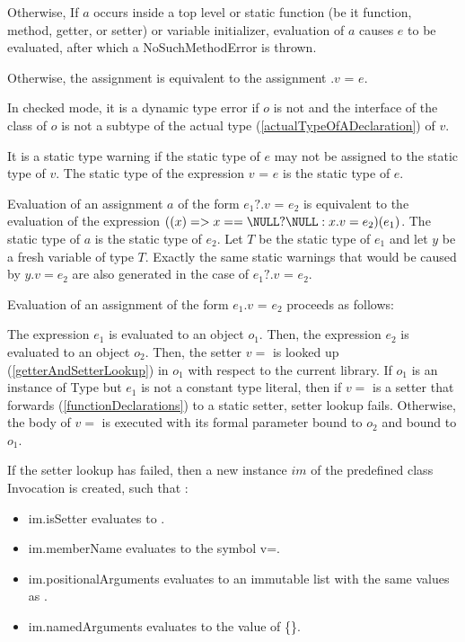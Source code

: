\documentclass{article}
\newcommand{\code}[1]{{\sf #1}}
\begin{document}
\LMHash{}
Otherwise, If  $a$ occurs inside a top level or static function (be it function, method, getter,  or setter) or variable initializer, evaluation of $a$ causes $e$ to be evaluated, after which a \code{NoSuchMethodError} is thrown. 

\LMHash{}
Otherwise, the assignment is equivalent to the assignment \code{ \THIS{}.$v$ = $e$}. 

\LMHash{}
In checked mode, it is a dynamic type error if $o$ is not \NULL{} and the interface of the class of $o$ is not a subtype of the actual type (\ref{actualTypeOfADeclaration}) of $v$.

\LMHash{}
It is a static type warning if the static type of $e$ may not be assigned to the static type of $v$. The static type of the expression $v$ \code{=} $e$ is the static type of $e$.

\LMHash{}
Evaluation of an assignment $a$ of the form $e_1?.v$ \code{=} $e_2$ is equivalent to the evaluation of the expression $((x) => x == \NULL? \NULL: x.v = e_2)(e_1)$. The static type of $a$ is the static type of $e_2$. Let $T$ be the static type of $e_1$ and let $y$ be a fresh variable of type $T$. Exactly the same static warnings that would be caused by $y.v = e_2$ are also generated in the case of $e_1?.v$ \code{=} $e_2$.

\LMHash{}
Evaluation of an assignment of the form $e_1.v$ \code{=} $e_2$ proceeds as follows:

\LMHash{}
The expression $e_1$ is evaluated to an object $o_1$. Then, the expression $e_2$  is evaluated to an object $o_2$. Then, the setter $v=$ is looked up (\ref{getterAndSetterLookup}) in $o_1$ with respect to the current library.  If $o_1$ is an instance of \code{Type} but $e_1$ is not a constant type literal, then if $v=$ is a setter that forwards (\ref{functionDeclarations}) to a static setter, setter lookup fails. Otherwise, the body  of $v=$ is executed with its formal parameter bound to $o_2$ and \THIS{} bound to $o_1$. 

\LMHash{}
If the setter lookup has failed, then a new instance $im$  of the predefined class  \code{Invocation}  is created, such that :
\begin{itemize}
\item  \code{im.isSetter} evaluates to \code{\TRUE{}}.
\item  \code{im.memberName} evaluates to the symbol \code{v=}.
\item \code{im.positionalArguments} evaluates to an immutable list with the same values as \code{[$o_2$]}.
\item \code{im.namedArguments} evaluates to the value of \code{\CONST{} \{\}}.
\end{itemize}
\end{document}
